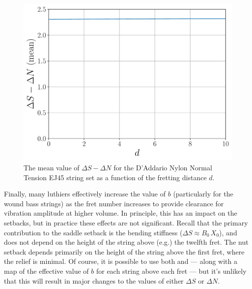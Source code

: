 \begin{figure}
  \centering
  \includegraphics[width=5.0in]{../figures/dsnd_ej45}
  \caption{\label{fig:dsnd_ej45} The mean value of $\Delta S - \Delta N$ for the D'Addario Nylon Normal Tension EJ45 string set as a function of the fretting distance $d$.}
\end{figure}

Finally, many luthiers effectively increase the value of $b$ (particularly for the wound bass strings) as the fret number increases to provide clearance for vibration amplitude at higher volume. In principle, this has an impact on the setbacks, but in practice these effects are not significant. Recall that the primary contribution to the saddle setback is the bending stiffness ($\Delta S \approx B_0\, X_0$), and does not depend on the height of the string above (e.g.) the twelfth fret. The nut setback depends primarily on the height of the string above the first fret, where the relief is minimal. Of course, it is possible to use both  and  --- along with a map of the effective value of $b$ for each string above each fret --- but it's unlikely that this will result in major changes to the values of either $\Delta S$ or $\Delta N$. 
